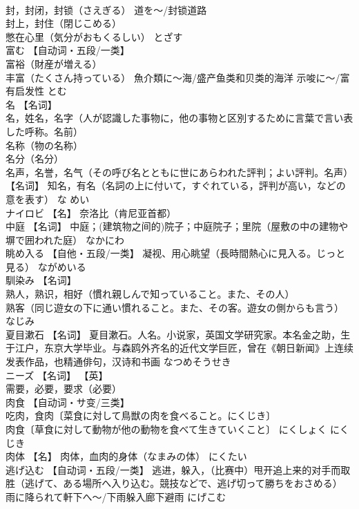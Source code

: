 \documentclass[8pt]{extreport}
\begin{document}
\begin{CJK}{UTF8}{min}
\\	封，封闭，封锁（さえぎる） 道を～/封锁道路 
\\	封上，封住（閉じこめる） 
\\	憋在心里（気分がおもくるしい）	とざす	
\\	富む	【自动词・五段/一类】 
\\	富裕（財産が増える） 
\\	丰富（たくさん持っている） 魚介類に～海/盛产鱼类和贝类的海洋 示唆に～/富有启发性	とむ	
\\	名	【名词】 
\\	名，姓名，名字（人が認識した事物に，他の事物と区別するために言葉で言い表した呼称。名前） 
\\	名称（物の名称） 
\\	名分（名分） 
\\	名声，名誉，名气（その呼び名とともに世にあらわれた評判；よい評判。名声） 【名词】 知名，有名（名詞の上に付いて，すぐれている，評判が高い，などの意を表す）	な めい	
\\	ナイロビ	【名】 奈洛比（肯尼亚首都）		
\\	中庭	【名词】 中庭；(建筑物之间的)院子；中庭院子；里院（屋敷の中の建物や塀で囲われた庭）	なかにわ	
\\	眺め入る	【自他・五段/一类】 凝视、用心眺望（長時間熱心に見入る。じっと見る）	ながめいる	
\\	馴染み	【名词】 
\\	熟人，熟识，相好（慣れ親しんで知っていること。また、その人） 
\\	熟客（同じ遊女の下に通い慣れること。また、その客。遊女の側からも言う）	なじみ	
\\	夏目漱石	【名词】 夏目漱石。人名。小说家，英国文学研究家。本名金之助，生于江户，东京大学毕业。与森鸥外齐名的近代文学巨匠，曾在《朝日新闻》上连续发表作品，也精通俳句，汉诗和书画	なつめそうせき	
\\	ニーズ	【名词】 【英】
\\	需要，必要，要求（必要）		
\\	肉食	【自动词・サ变/三类】 
\\	吃肉，食肉〔菜食に対して鳥獣の肉を食べること。にくじき〕 
\\	肉食〔草食に対して動物が他の動物を食べて生きていくこと〕	にくしょく にくじき	
\\	肉体	【名】 肉体，血肉的身体（なまみの体）	にくたい	
\\	逃げ込む	【自动词・五段/一类】 逃进，躲入，（比赛中）甩开追上来的对手而取胜（逃げて、ある場所へ入り込む。競技などで、逃げ切って勝ちをおさめる） 雨に降られて軒下へ～/下雨躲入廊下避雨	にげこむ	

\end{CJK}
\end{document}
